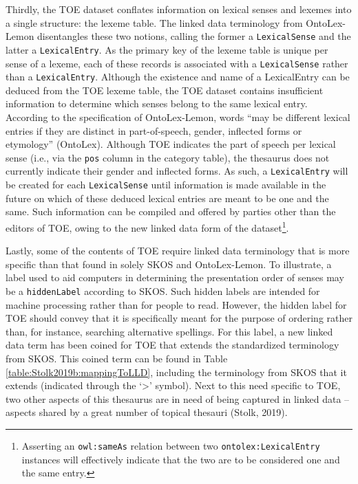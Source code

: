 Thirdly, the TOE dataset conflates information on lexical senses and lexemes into a single structure: the lexeme table. The linked data terminology from OntoLex-Lemon disentangles these two notions, calling the former a  \texttt{LexicalSense} and the latter a  \texttt{LexicalEntry}. As the primary key of the lexeme table is unique per sense of a lexeme, each of these records is associated with a  \texttt{LexicalSense} rather than a  \texttt{LexicalEntry}. Although the existence and name of a LexicalEntry can be deduced from the TOE lexeme table, the TOE dataset contains insufficient information to determine which senses belong to the same lexical entry. According to the specification of OntoLex-Lemon, words “may be different lexical entries if they are distinct in part-of-speech, gender, inflected forms or etymology” (OntoLex). Although TOE indicates the part of speech per lexical sense (i.e., via the  \texttt{pos} column in the category table), the thesaurus does not currently indicate their gender and inflected forms. As such, a  \texttt{LexicalEntry} will be created for each  \texttt{LexicalSense} until information is made available in the future on which of these deduced lexical entries are meant to be one and the same. Such information can be compiled and offered by parties other than the editors of TOE, owing to the new linked data form of the dataset\footnote{Asserting an  \texttt{owl:sameAs} relation between two  \texttt{ontolex:LexicalEntry} instances will effectively indicate that the two are to be considered one and the same entry.}.

Lastly, some of the contents of TOE require linked data terminology that is more specific than that found in solely SKOS and OntoLex-Lemon. To illustrate, a label used to aid computers in determining the presentation order of senses may be a  \texttt{hiddenLabel} according to SKOS. Such hidden labels are intended for machine processing rather than for people to read. However, the hidden label for TOE should convey that it is specifically meant for the purpose of ordering rather than, for instance, searching alternative spellings. For this label, a new linked data term has been coined for TOE that extends the standardized terminology from SKOS. This coined term can be found in Table \ref{table:Stolk2019b:mappingToLLD}, including the terminology from SKOS that it extends (indicated through the ‘>’ symbol). Next to this need specific to TOE, two other aspects of this thesaurus are in need of being captured in linked data – aspects shared by a great number of topical thesauri (Stolk, 2019).

